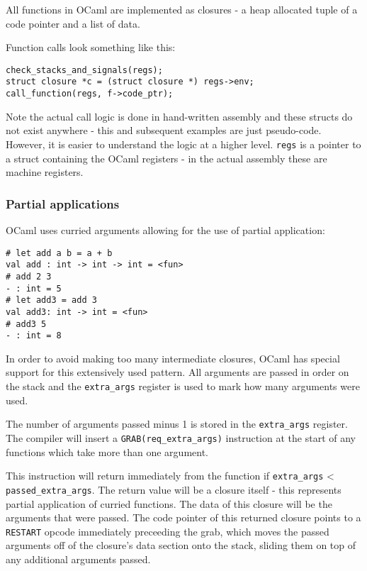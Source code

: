 All functions in OCaml are implemented as closures - a heap allocated tuple of a code pointer and a
list of data.

Function calls look something like this:

\begin{verbatim}
check_stacks_and_signals(regs);
struct closure *c = (struct closure *) regs->env;
call_function(regs, f->code_ptr);
\end{verbatim}

Note the actual call logic is done in hand-written assembly and these structs do not exist anywhere
- this and subsequent examples are just pseudo-code. However, it is easier to understand the logic
at a higher level. \texttt{regs} is a pointer to a struct containing the OCaml registers - in the
actual assembly these are machine registers.

\subsubsection{Partial applications}

OCaml uses curried arguments allowing for the use of partial application:

\begin{verbatim}
# let add a b = a + b
val add : int -> int -> int = <fun>
# add 2 3
- : int = 5
# let add3 = add 3
val add3: int -> int = <fun>
# add3 5
- : int = 8
\end{verbatim}

In order to avoid making too many intermediate closures, OCaml has special support for this
extensively used pattern. All arguments are passed in order on the stack and the
\texttt{extra\_args}
register is used to mark how many arguments were used.

The number of arguments passed minus 1 is stored in the \texttt{extra\_args} register. The compiler
will insert a \texttt{GRAB(req\_extra\_args)} instruction at the start of any functions which take
more than one argument.

This instruction will return immediately from the function if \texttt{extra\_args} <
\texttt{passed\_extra\_args}. The return value will be a closure itself - this represents partial
application of curried functions. The data of this closure will be the arguments that were passed.
The code pointer of this returned closure points to a \texttt{RESTART} opcode immediately
preceeding the grab, which moves the passed arguments off of the closure's data section onto the
stack, sliding them on top of any additional arguments passed.

